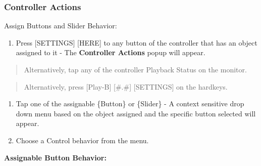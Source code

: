 \documentclass[
]{article}
\providecommand{\tightlist}{%
  \setlength{\itemsep}{0pt}\setlength{\parskip}{0pt}}
\begin{document}
\hypertarget{controller-actions-1}{%
\subsubsection{Controller Actions}\label{controller-actions-1}}

Assign Buttons and Slider Behavior:

\begin{enumerate}
\def\labelenumi{\arabic{enumi}.}
\tightlist
\item
  Press {[}SETTINGS{]} {[}HERE{]} to any button of the controller that has an object assigned to it - The \textbf{Controller Actions} popup will appear.
\end{enumerate}

\begin{quote}
Alternatively, tap any of the controller Playback Status on the monitor.
\end{quote}

\begin{quote}
Alternatively, press {[}Play-B{]} {[}\#.\#{]} {[}SETTINGS{]} on the hardkeys.
\end{quote}

\begin{enumerate}
\def\labelenumi{\arabic{enumi}.}
\setcounter{enumi}{1}
\item
  Tap one of the assignable \{Button\} or \{Slider\} - A context sensitive drop down menu based on the object assigned and the specific button selected will appear.
\item
  Choose a Control behavior from the menu.
\end{enumerate}

\textbf{Assignable Button Behavior:}
\end{document}
